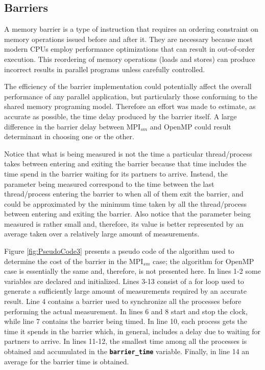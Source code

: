 \newpage

\subsection*{Barriers}

A memory barrier is a type of instruction that requires an ordering constraint on memory operations issued before and after it. They are necessary because most modern CPUs employ performance optimizations that can result in out-of-order execution. This reordering of memory operations (loads and stores) can produce incorrect results in parallel programs unless carefully controlled.

\medskip


The efficiency of the barrier implementation could potentially affect the overall performance of any parallel application, but particularly those conforming to the shared memory programing model. Therefore an effort was made to estimate, as accurate as possible, the time delay produced by the barrier itself. A large difference in the barrier delay between MPI$_{sm}$ and OpenMP could result determinant in choosing one or the other.

\medskip

Notice that what is being measured is not the time a particular thread/process takes between entering and exiting
the barrier because that time includes the time spend in the barrier waiting for its partners to arrive. Instead, the parameter being measured correspond to the time between the last thread/process entering the barrier to when all of them exit the barrier\cite{Schmidt_2012}, and could be approximated by the minimum time taken by all the thread/process between entering and exiting the barrier. Also notice that the parameter being measured is rather small and, therefore, its value is better represented by an average taken over a relatively large amount of measurements.


\medskip

Figure \ref{fig:PseudoCode3} presents a pseudo code of the algorithm used to determine the cost of the barrier in the MPI$_{sm}$ case; the algorithm for OpenMP case is essentially the same and, therefore, is not presented here. In lines 1-2 some variables are declared and initialized. Lines 3-13 consist of a for loop used to generate a sufficiently large amount of measurements required by an accurate result. Line 4 contains a barrier used to synchronize all the processes before performing the actual measurement. In lines 6 and 8 start and stop the clock, while line 7 contains the barrier being timed. In line 10, each process gets the time it spends in the barrier which, in general, includes a delay due to waiting for partners to arrive. In lines 11-12, the smallest time among all the processes is obtained and accumulated in the \textbf{\texttt{barrier\_time}} variable. Finally, in line 14 an average for the barrier time is obtained.



